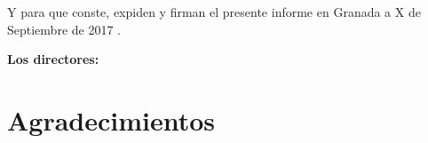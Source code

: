 \vspace{0.5cm}

Y para que conste, expiden y firman el presente informe en Granada a X de Septiembre de 2017 .

\vspace{1cm}

\textbf{Los directores:}

\vspace{5cm}

\noindent \textbf{\myProf}

\chapter*{Agradecimientos}
\thispagestyle{empty}

       \vspace{1cm}


